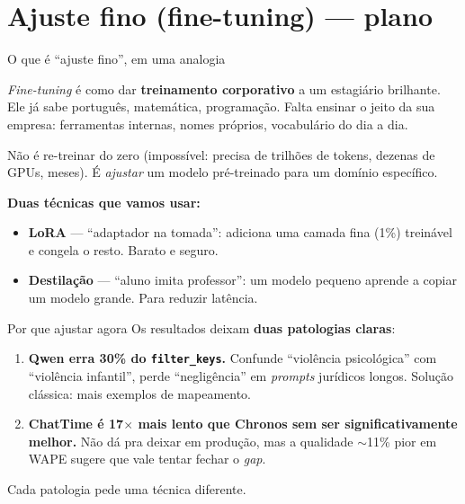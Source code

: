 \documentclass[10pt,aspectratio=169]{beamer}
\newcommand{\code}[1]{\texttt{\small #1}}
\begin{document}
\section{Ajuste fino (fine-tuning) --- plano}

\begin{frame}{O que é ``ajuste fino'', em uma analogia}
\begin{destaque}
\emph{Fine-tuning} é como dar \textbf{treinamento corporativo} a um
estagiário brilhante. Ele já sabe português, matemática, programação.
Falta ensinar o jeito da sua empresa: ferramentas internas, nomes
próprios, vocabulário do dia a dia.
\end{destaque}

\vspace{0.4em}
Não é re-treinar do zero (impossível: precisa de trilhões de tokens,
dezenas de GPUs, meses). É \emph{ajustar} um modelo pré-treinado para
um domínio específico.

\vspace{0.4em}
\textbf{Duas técnicas que vamos usar:}
\begin{itemize}\small
\item \textbf{LoRA} --- ``adaptador na tomada'': adiciona uma camada
fina (1\%) treinável e congela o resto. Barato e seguro.
\item \textbf{Destilação} --- ``aluno imita professor'': um modelo
pequeno aprende a copiar um modelo grande. Para reduzir latência.
\end{itemize}
\end{frame}

\begin{frame}{Por que ajustar agora}
Os resultados deixam \textbf{duas patologias claras}:

\begin{enumerate}\setlength\itemsep{0.3em}
\item \textbf{Qwen erra 30\% do \code{filter\_keys}.} Confunde
``violência psicológica'' com ``violência infantil'', perde
``negligência'' em \emph{prompts} jurídicos longos. Solução clássica:
mais exemplos de mapeamento.

\item \textbf{ChatTime é 17$\times$ mais lento que Chronos sem ser
significativamente melhor.} Não dá pra deixar em produção, mas a
qualidade $\sim$11\% pior em WAPE sugere que vale tentar fechar o
\emph{gap}.
\end{enumerate}

\vspace{0.5em}
\alert{Cada patologia pede uma técnica diferente.}
\end{frame}
\end{document}
